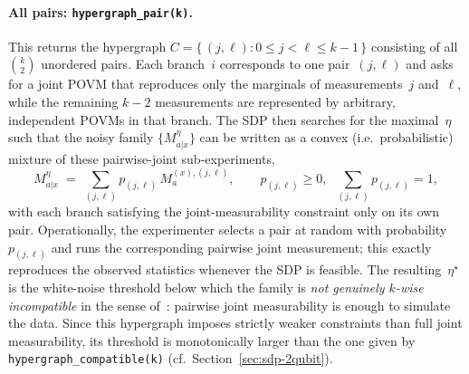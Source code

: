 \documentclass[oneside, a4paper, onecolumn, 11pt]{article}
\theoremstyle{definition}
\theoremstyle{plain}
\theoremstyle{remark}
\begin{document}
\paragraph{All pairs:
\texttt{hypergraph\_pair(k)}.}
This returns the hypergraph
$C = \{\,(j, \ell) : 0 \le j < \ell \le k-1\,\}$ consisting of all
$\binom{k}{2}$ unordered pairs. Each branch~$i$ corresponds to one
pair~$(j, \ell)$ and asks for a joint POVM that reproduces only the
marginals of measurements~$j$ and~$\ell$, while the remaining $k - 2$
measurements are represented by arbitrary, independent POVMs in that
branch. The SDP then searches for the maximal~$\eta$ such that the
noisy family $\{M^{\eta}_{a|x}\}$ can be written as a convex (i.e.\
probabilistic) mixture of these pairwise-joint sub-experiments,
\begin{equation*}
  M^{\eta}_{a|x} \;=\; \sum_{(j,\ell)} p_{(j,\ell)}\,
                          M^{(x), (j,\ell)}_{a},
  \qquad p_{(j,\ell)} \ge 0,\;\; \sum_{(j,\ell)} p_{(j,\ell)} = 1,
\end{equation*}
with each branch satisfying the joint-measurability constraint only on
its own pair. Operationally, the experimenter selects a pair at random
with probability~$p_{(j,\ell)}$ and runs the corresponding pairwise
joint measurement; this exactly reproduces the observed statistics
whenever the SDP is feasible. The resulting~$\eta^{\star}$ is the
white-noise threshold below which the family is \emph{not genuinely
$k$-wise incompatible} in the sense of~\cite{Quintino2019}: pairwise
joint measurability is enough to simulate the data. Since this
hypergraph imposes strictly weaker constraints than full joint
measurability, its threshold is monotonically larger than the one given
by \texttt{hypergraph\_compatible(k)} (cf.\
Section~\ref{sec:sdp-2qubit}).
\end{document}
